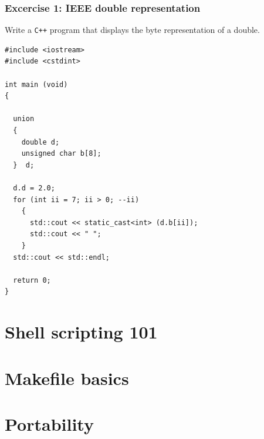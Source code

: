 \documentclass[10pt,c,ignorenonframetext]{beamer}
\begin{document}
\begin{frame}[fragile]
\frametitle{Excercise 1: IEEE double representation}

Write a {\tt C++} program that displays the byte 
representation of a double.

\scriptsize
\begin{lstlisting}
#include <iostream>
#include <cstdint>

int main (void)
{

  union 
  {
    double d;
    unsigned char b[8];
  }  d;

  d.d = 2.0;
  for (int ii = 7; ii > 0; --ii)
    {      
      std::cout << static_cast<int> (d.b[ii]);
      std::cout << " ";
    }
  std::cout << std::endl;

  return 0;
}
\end{lstlisting}
\end{frame}

\section{Shell scripting 101}
\frame{}

\section{Makefile basics}
\frame{}

\section{Portability}
\frame{}
\end{document}
